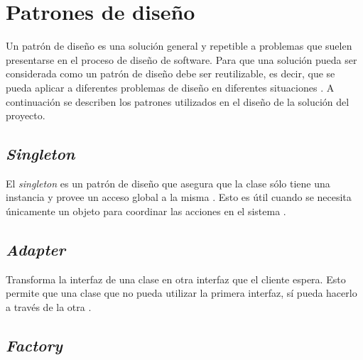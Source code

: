 \section{Patrones de diseño} \label{sect:Patrones de diseno}

Un patrón de diseño es una solución general y repetible a problemas que suelen presentarse en el proceso de diseño de software. Para que una solución pueda ser considerada como un patrón de diseño debe ser reutilizable, es decir, que se pueda aplicar a diferentes problemas de diseño en diferentes situaciones \cite{DSP0}. A continuación se describen los patrones utilizados en el diseño de la solución del proyecto.


\subsection{\textit{Singleton}}

El \textit{singleton} es un patrón de diseño que asegura que la clase sólo tiene una instancia y provee un acceso global a la misma \cite{DSP1}. Esto es útil cuando se necesita únicamente un objeto para coordinar las acciones en el sistema \cite{SNG0}.

\subsection{\textit{Adapter}}

Transforma la interfaz de una clase en otra interfaz que el cliente espera. Esto permite que una clase que no pueda utilizar la primera interfaz, sí pueda hacerlo a través de la otra \cite{DSP1}.

\subsection{\textit{Factory}} 

